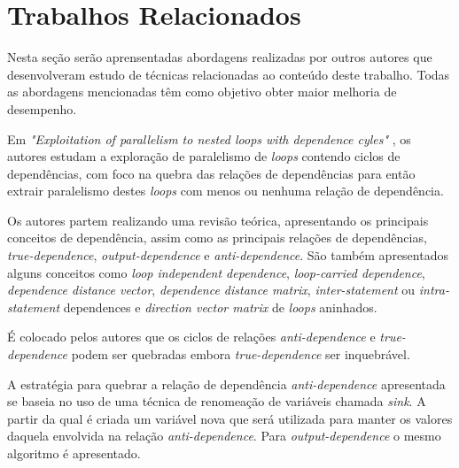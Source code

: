
\section{Trabalhos Relacionados}

Nesta seção serão aprensentadas abordagens realizadas por outros autores que 
desenvolveram estudo de técnicas relacionadas ao conteúdo deste trabalho.
Todas as abordagens mencionadas têm como objetivo obter maior melhoria de 
desempenho.




Em \textit{"Exploitation of parallelism to nested loops with dependence
cyles"} \cite{Chang:2004}, os autores estudam a exploração de paralelismo de
\textit{loops} contendo ciclos de dependências, com foco na quebra das relações 
de dependências para então extrair paralelismo destes \textit{loops} com menos
ou nenhuma relação de dependência.

Os autores partem realizando uma revisão teórica, apresentando os principais
conceitos de dependência, assim como as principais relações de dependências, 
\textit{true-dependence}, \textit{output-dependence} e \textit{anti-dependence}.  
São também apresentados alguns conceitos como \textit{loop independent dependence}, 
\textit{loop-carried dependence}, \textit{dependence distance vector}, 
\textit{dependence distance matrix}, \textit{inter-statement} ou
\textit{intra-statement} dependences e \textit{direction vector matrix} de
\textit{loops} aninhados.

É colocado pelos autores que os ciclos de relações \textit{anti-dependence} e
\textit{true-dependence} podem ser quebradas embora \textit{true-dependence} ser
inquebrável.

A estratégia para quebrar a relação de dependência \textit{anti-dependence}
apresentada se baseia no uso de uma técnica de renomeação de variáveis
chamada \textit{sink}. 
A partir da qual é criada um variável nova que será utilizada para manter os
valores daquela envolvida na relação \textit{anti-dependence}.  
Para \textit{output-dependence} o mesmo algoritmo é apresentado.

